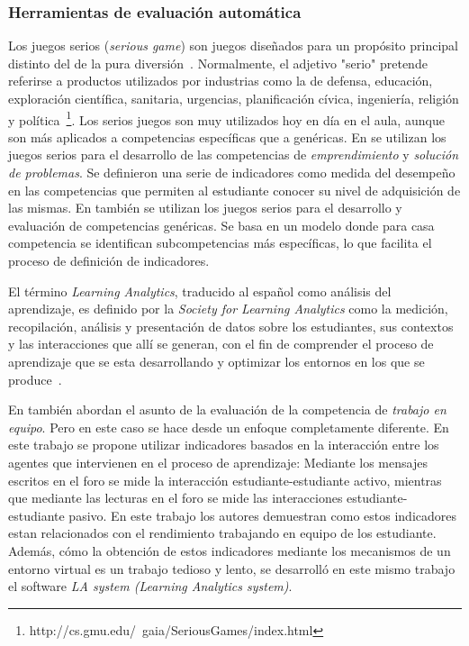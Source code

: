 
\subsubsection{Herramientas de evaluación automática}

Los juegos serios (\emph{serious game}) son juegos diseñados para un propósito principal distinto del de la pura diversión~\cite{djaouti2011classifying}. Normalmente, el adjetivo "serio" pretende referirse a productos utilizados por industrias como la de defensa, educación, exploración científica, sanitaria, urgencias, planificación cívica, ingeniería, religión y política~\footnote{http://cs.gmu.edu/~gaia/SeriousGames/index.html}. Los serios juegos son muy utilizados hoy en día en el aula, aunque son más aplicados a competencias específicas que a genéricas. En \cite{guenaga2013serious} se utilizan los juegos serios para el desarrollo de las competencias de \emph{emprendimiento} y \emph{solución de problemas}. Se definieron una serie de indicadores como medida del desempeño en las competencias que permiten al estudiante conocer su nivel de adquisición de las mismas. En \cite{bedek2011behavioral} también se utilizan los juegos serios para el desarrollo y evaluación de competencias genéricas. Se basa en un modelo donde para casa competencia se identifican subcompetencias más específicas, lo que facilita el proceso de definición de indicadores.

El término \emph{Learning Analytics}, traducido al español como análisis del aprendizaje, es definido por la \emph{Society for Learning Analytics} como la medición, recopilación, análisis y presentación de datos sobre los estudiantes, sus contextos y las interacciones que allí se generan, con el fin de comprender el proceso de aprendizaje que se esta desarrollando y optimizar los entornos en los que se produce~\cite{siemens2012learning}.

En \cite{fidalgo:2015} también abordan el asunto de la evaluación de la competencia de \emph{trabajo en equipo}. Pero en este caso se hace desde un enfoque completamente diferente. En este trabajo se propone utilizar indicadores basados en la interacción entre los agentes que intervienen en el proceso de aprendizaje: Mediante los mensajes escritos en el foro se mide la interacción estudiante-estudiante activo, mientras que mediante las lecturas en el foro se mide las interacciones estudiante-estudiante pasivo. En este trabajo los autores demuestran como estos indicadores estan relacionados con el rendimiento trabajando en equipo de los estudiante. Además, cómo la obtención de estos indicadores mediante los mecanismos de un entorno virtual es un trabajo tedioso y lento, se desarrolló en este mismo trabajo el software \emph{LA system (Learning Analytics system)}.

